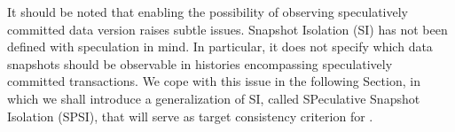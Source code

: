 %
%

It should be noted that enabling the possibility of observing speculatively committed data version raises subtle issues.  Snapshot Isolation (SI) has not been defined with speculation in mind. In particular, it does not specify which data snapshots should be observable in histories encompassing speculatively committed transactions. We cope with this issue in the following Section, in which we shall introduce a generalization of SI, called SPeculative Snapshot Isolation (SPSI), that will serve as target consistency criterion for \specula.



